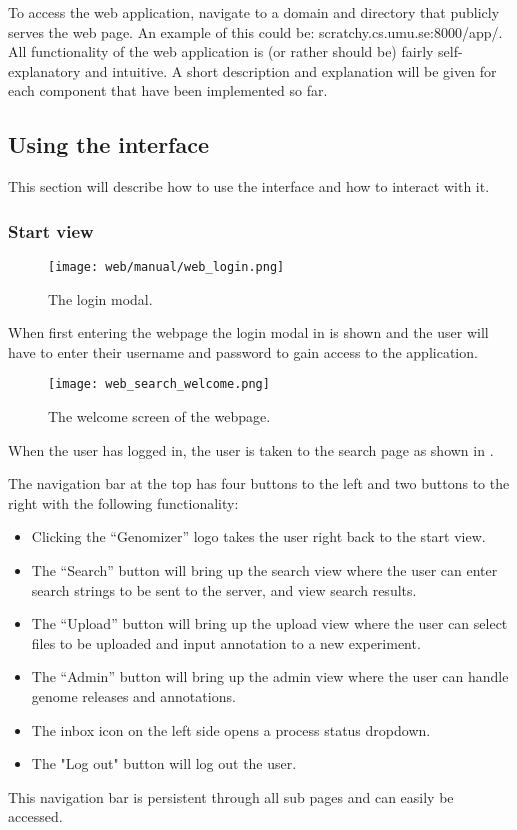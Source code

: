 To access the web application, navigate to a domain and directory that publicly serves the web page. An example of this could be: scratchy.cs.umu.se:8000/app/.
All functionality of the web application is (or rather should be) fairly self-explanatory and intuitive. A short description and explanation will be given for each component that have been implemented so far.
\subsection{Using the interface}
This section will describe how to use the interface and how to interact with it.
\subsubsection{Start view}
\begin{figure}[h]
\centering
\texttt{[image: web/manual/web\_login.png]}
\caption{\label{fig:web_search_login} The login modal.}
\end{figure}
When first entering the webpage the login modal in  is shown and the user will have to enter their username and password to gain access to the application.

\begin{figure}[h] 
\centering
\texttt{[image: web\_search\_welcome.png]}
\caption{\label{fig:web_search_welcome} The welcome screen of the webpage.}
\end{figure}

When the user has logged in, the user is taken to the search page as shown in .

The navigation bar at the top has four buttons to the left and two buttons to the right with the following functionality:
\begin{itemize}
	\item Clicking the “Genomizer” logo takes the user right back to the start view.
	\item The “Search” button will bring up the search view where the user can enter search strings to be sent to the server, and view search results.
	\item The “Upload” button will bring up the upload view where the user can select files to be uploaded and input annotation to a new experiment.
	\item The “Admin” button will bring up the admin view where the user can handle genome releases and annotations.
    \item The inbox icon on the left side opens a process status dropdown.
    \item The "Log out" button will log out the user.
\end{itemize}
This navigation bar is persistent through all sub pages and can easily be accessed.

